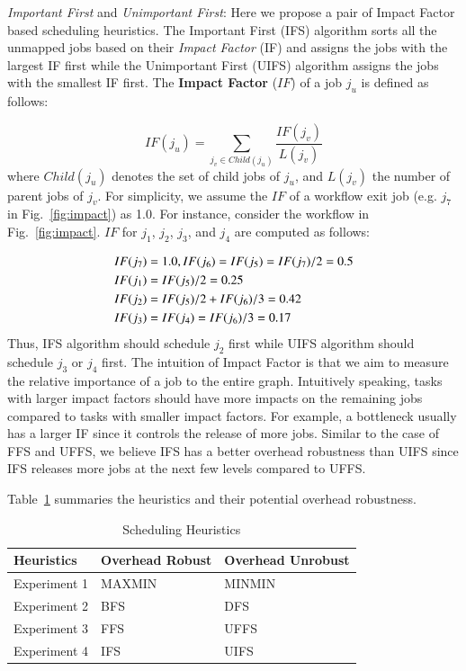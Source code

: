 \documentclass[final,5p,times,twocolumn]{elsarticle}
\begin{document}
\emph{Important First} and \emph{Unimportant First}: Here we propose a pair of Impact Factor based scheduling heuristics. The Important First (IFS) algorithm sorts all the unmapped jobs based on their \emph{Impact Factor} (IF) and assigns the jobs with the largest IF first while the Unimportant First (UIFS) algorithm assigns the jobs with the smallest IF first. 
The \textbf{Impact Factor} ($IF$) of a job $j_u$ is defined as follows:

\begin{equation}
	IF(j_u)=\sum_{j_v\in Child(j_u)}^{}\frac{IF(j_v)}{L(j_v)}
\end{equation}
where $Child(j_u)$ denotes the set of child jobs of $j_u$, and $L(j_v)$ the number of parent jobs of $j_v$. For simplicity, we assume the $IF$ of a workflow exit job (e.g. $j_7$ in Fig.~\ref{fig:impact}) as 1.0. For instance, consider the workflow in Fig.~\ref{fig:impact}. $IF$ for $j_1$, $j_2$, $j_3$, and $j_4$ are computed as follows:

\begin{eqnarray}
	\displaystyle  
	&IF(j_7 )=1.0, IF(j_6 )=IF(j_5 )=IF(j_7 )/2=0.5\nonumber  \\
	&IF(j_1 )=IF(j_5)/2=0.25\nonumber \\
	&IF(j_2 )=IF(j_5 )/2+IF(j_6)/3=0.42\nonumber \\
	&IF(j_3 )=IF(j_4 )=IF(j_6 )/3=0.17\nonumber 
\end{eqnarray}
Thus, IFS algorithm should schedule $j_2$ first while UIFS algorithm should schedule $j_3$ or $j_4$ first. The intuition of Impact Factor is that we aim to measure the relative importance of a job to the entire graph. Intuitively speaking, tasks with larger impact factors should have more impacts on the remaining jobs compared to tasks with smaller impact factors. For example, a bottleneck usually has a larger IF since it controls the release of more jobs. 
Similar to the case of FFS and UFFS, we believe IFS has a better overhead robustness than UIFS since IFS releases more jobs at the next few levels compared to UFFS. 


Table~\ref{tab:heuristics} summaries the heuristics and their potential overhead robustness. 
\begin{table}[H]
\caption{Scheduling Heuristics}
\begin{center}
  \begin{tabular}{ l|l|l}
    \hline
Heuristics & Overhead Robust & Overhead Unrobust \\ \hline
    Experiment 1 & MAXMIN & MINMIN \\ \hline
   Experiment 2 & BFS & DFS \\ \hline
 Experiment 3 & FFS & UFFS \\ \hline
Experiment 4 & IFS & UIFS\\
    \hline
  \end{tabular}
\label{tab:heuristics}
\end{center}
\end{table}
\end{document}
